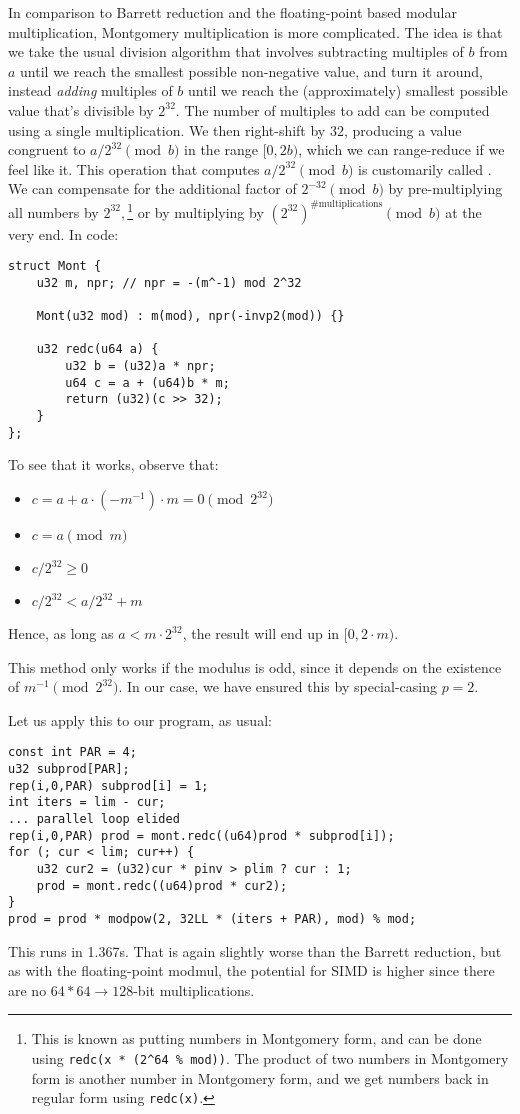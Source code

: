 In comparison to Barrett reduction and the floating-point based modular multiplication, Montgomery multiplication is more complicated.
The idea is that we take the usual division algorithm that involves subtracting multiples of $b$ from $a$ until we reach the smallest possible non-negative value, and turn it around, instead \emph{adding} multiples of $b$ until we reach the (approximately) smallest possible value that's divisible by $2^{32}$.
The number of multiples to add can be computed using a single multiplication.
We then right-shift by $32$, producing a value congruent to $a / 2^{32} \pmod b$ in the range $[0, 2b)$, which we can range-reduce if we feel like it.
This operation that computes $a / 2^{32} \pmod b$ is customarily called \verb@redc@.
We can compensate for the additional factor of $2^{-32} \pmod b$ by pre-multiplying all numbers by $2^{32},$\footnote{
This is known as putting numbers in Montgomery form, and can be done using \texttt{redc(x * (2\^{}64 \% mod))}.
The product of two numbers in Montgomery form is another number in Montgomery form, and we get numbers back in regular form using \texttt{redc(x)}.
} or by multiplying by $(2^{32})^{\text{\#multiplications}} \pmod b$ at the very end.
In code:

\begin{lstlisting}
struct Mont {
	u32 m, npr; // npr = -(m^-1) mod 2^32

	Mont(u32 mod) : m(mod), npr(-invp2(mod)) {}

	u32 redc(u64 a) {
		u32 b = (u32)a * npr;
		u64 c = a + (u64)b * m;
		return (u32)(c >> 32);
	}
};
\end{lstlisting}

To see that it works, observe that:
\begin{itemize}
  \item $c = a + a \cdot (-m^{-1}) \cdot m = 0 \pmod{2^{32}}$
  \item $c = a \pmod{m}$
  \item $c/2^{32} \ge 0$
  \item $c/2^{32} < a/2^{32} + m$
\end{itemize}
Hence, as long as $a < m\cdot 2^{32}$, the result will end up in $[0, 2\cdot m)$.

This method only works if the modulus is odd, since it depends on the existence of $m^{-1} \pmod{2^{32}}$. In our case, we have ensured this by special-casing $p = 2$.

Let us apply this to our program, as usual:
\begin{lstlisting}
const int PAR = 4;
u32 subprod[PAR];
rep(i,0,PAR) subprod[i] = 1;
int iters = lim - cur;
... parallel loop elided
rep(i,0,PAR) prod = mont.redc((u64)prod * subprod[i]);
for (; cur < lim; cur++) {
	u32 cur2 = (u32)cur * pinv > plim ? cur : 1;
	prod = mont.redc((u64)prod * cur2);
}
prod = prod * modpow(2, 32LL * (iters + PAR), mod) % mod;
\end{lstlisting}
This runs in 1.367s. That is again slightly worse than the Barrett reduction, but as with the floating-point modmul, the potential for SIMD is higher since there are no \mbox{$64*64\rightarrow128$}-bit multiplications.

